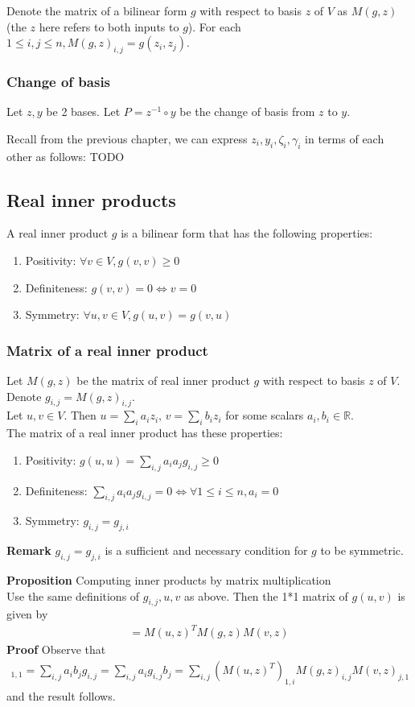 \documentclass{article}
\begin{document}
Denote the matrix of a bilinear form $g$ with respect to basis $z$ of $V$ as $M(g, z)$ (the $z$ here refers to both inputs to $g$).
For each $1\leq i,j\leq n, M(g,z)_{i,j}=g(z_i,z_j)$.

\subsubsection{Change of basis}
Let $z,y$ be 2 bases. Let $P=z^{-1}\circ y$ be the change of basis from $z$ to $y$.

Recall from the previous chapter, we can express $z_i,y_i,\zeta_i,\gamma_i$ in terms of each other as follows:
TODO


\subsection{Real inner products}
A real inner product $g$ is a bilinear form that has the following properties:
\begin{enumerate}
	\item Positivity: $\forall v\in V, g(v,v)\geq 0$
	\item Definiteness: $g(v,v)=0\iff v=0$
	\item Symmetry: $\forall u,v\in V, g(u,v)=g(v,u)$
\end{enumerate}
\subsubsection{Matrix of a real inner product}
Let $M(g,z)$ be the matrix of real inner product $g$ with respect to basis $z$ of $V$. Denote $g_{i,j}=M(g,z)_{i,j}$.\\
Let $u,v\in V$. Then $u=\sum_i a_iz_i,\, v=\sum_i b_iz_i$ for some scalars $a_i,b_i\in \mathbb{R}$.\\
The matrix of a real inner product has these properties:
\begin{enumerate}
	\item Positivity: $g(u,u)=\sum_{i,j} a_ia_j g_{i,j}\geq 0$
	\item Definiteness: $\sum_{i,j} a_ia_j g_{i,j}=0 \iff \forall 1\leq i\leq n, a_i=0$
	\item Symmetry: $g_{i,j}=g_{j,i}$
\end{enumerate}
\textbf{Remark} $g_{i,j}=g_{j,i}$ is a sufficient and necessary condition for $g$ to be symmetric.

\textbf{Proposition} Computing inner products by matrix multiplication\\
Use the same definitions of $g_{i,j},u,v$ as above. Then the 1*1 matrix of $g(u,v)$ is given by
\begin{align*}
	[g(u,v)] = M(u,z)^TM(g,z)M(v,z)
\end{align*}
\textbf{Proof} Observe that 
\begin{align*}
	[g(u,v)]_{1,1} = \sum_{i,j}a_ib_j g_{i,j} = \sum_{i,j}a_ig_{i,j}b_j = \sum_{i,j}(M(u,z)^T)_{1,i} M(g,z)_{i,j} M(v,z)_{j,1}
\end{align*}
and the result follows.
\end{document}
